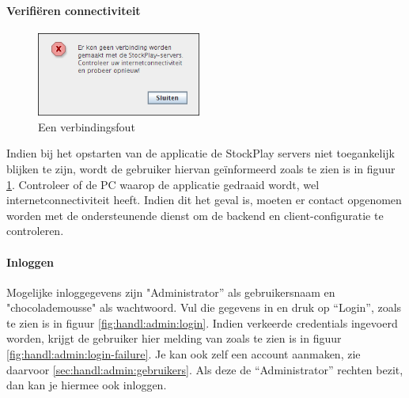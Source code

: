 \paragraph{Verifi\"eren connectiviteit}
\begin{figure}
	\centering
		\includegraphics[width=0.48\textwidth]{images/handleiding/administratie/verbindingsfout}
	\caption{Een verbindingsfout}
	\label{fig:handl:admin:verbindingsfout}
\end{figure}

Indien bij het opstarten van de applicatie de StockPlay servers niet toegankelijk blijken te zijn, wordt de gebruiker hiervan ge\"informeerd zoals te zien is in figuur \ref{fig:handl:admin:verbindingsfout}. Controleer of de PC waarop de applicatie gedraaid wordt, wel internetconnectiviteit heeft. Indien dit het geval is, moeten er contact opgenomen worden met de ondersteunende dienst om de backend en client-configuratie te controleren.

\paragraph{Inloggen}

Mogelijke inloggegevens zijn "Administrator'' als gebruikersnaam en "chocolademousse" als wachtwoord. Vul die gegevens in en druk op ``Login'', zoals te zien is in figuur \ref{fig:handl:admin:login}. Indien verkeerde credentials ingevoerd worden, krijgt de gebruiker hier melding van zoals te zien is in figuur \ref{fig:handl:admin:login-failure}.
Je kan ook zelf een account aanmaken, zie daarvoor \ref{sec:handl:admin:gebruikers}. Als deze de ``Administrator'' rechten bezit, dan kan je hiermee ook inloggen.

